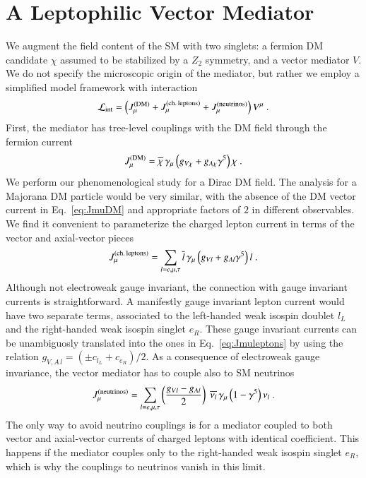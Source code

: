\documentclass[final,5p,twocolumn]{elsarticle}
\newcommand{\be}{\begin{equation}}
\newcommand{\ee}{\end{equation}}
\newcommand{\Eq}[1]{Eq.~\eqref{#1}}
\begin{document}
\section{A Leptophilic Vector Mediator}
\label{sec:simplifiedmodel}

We augment the field content of the SM with two singlets: a fermion DM candidate $\chi$ assumed to be stabilized by a $Z_2$ symmetry, and a vector mediator $V$. We do not specify the microscopic origin of the mediator, but rather we employ a simplified model framework with interaction
\be
\mathcal{L}_{\rm int} = \left(J_\mu^{\rm (DM)} + J_\mu^{\rm (ch. \, leptons)} + J_\mu^{\rm (neutrinos)} \right)  V^\mu  \ .
\label{eq:LagSimplifiedModel}
\ee
First, the mediator has tree-level couplings with the DM field through the fermion current
\be
J_\mu^{\rm (DM)} = \overline{\chi} \, \gamma_\mu \left( g_{V \chi} + g_{A \chi} \gamma^5 \right) \chi \ .
\label{eq:JmuDM}
\ee
We perform our phenomenological study for a Dirac DM field. The analysis for a Majorana DM particle would be very similar, with the absence of the DM vector current in \Eq{eq:JmuDM} and appropriate factors of $2$ in different observables. We find it convenient to parameterize the charged lepton current in terms of the vector and axial-vector pieces
\be
J_\mu^{\rm (ch. \, leptons)} =  \sum_{l = e, \mu, \tau} \overline{l} \, \gamma_\mu \left(g_{V l} + g_{A l} \gamma^5 \right) l \ .
\label{eq:Jmuleptons} 
\ee
Although not electroweak gauge invariant, the connection with gauge invariant currents is straightforward. A manifestly gauge invariant lepton current would have two separate terms, associated to the left-handed weak isospin doublet $l_L$ and the right-handed weak isospin singlet $e_R$. These gauge invariant currents can be unambiguosly translated into the ones in \Eq{eq:Jmuleptons} by using the relation $g_{V,A \, l} = (\pm c_{l_L} + c_{e_R}) / 2$. As a consequence of electroweak gauge invariance, the vector mediator has to couple also to SM neutrinos
\be
J_\mu^{\rm (neutrinos)} =  \sum_{l = e, \mu, \tau} \left( \frac{g_{V l} - g_{A l}}{2} \right) \; \overline{\nu_l} \, \gamma_\mu \left(1 - \gamma^5 \right) \nu_l \ .
\label{eq:Jmuneutrinos} 
\ee
The only way to avoid neutrino couplings is for a mediator coupled to both vector and axial-vector currents of charged leptons with identical coefficient. This happens if the mediator couples only to the right-handed weak isospin singlet $e_R$, which is why the couplings to neutrinos vanish in this limit. 
\end{document}
